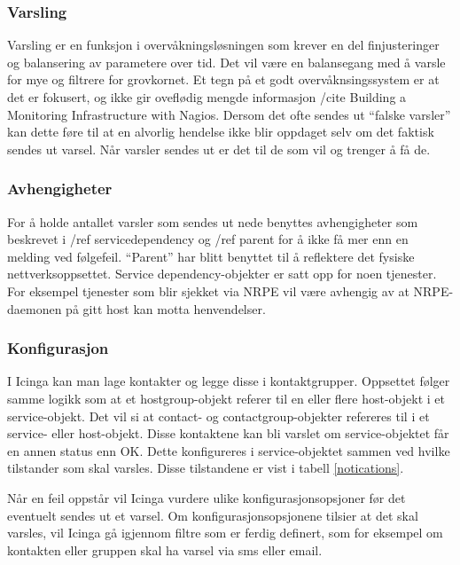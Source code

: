 \subsubsection{Varsling}
Varsling er en funksjon i overvåkningsløsningen som krever en del finjusteringer og balansering av parametere over tid. Det vil være en balansegang med å varsle for mye og filtrere for grovkornet. Et tegn på et godt overvåknsingssystem er at det er fokusert, og ikke gir oveflødig mengde informasjon /cite {Building a Monitoring Infrastructure with Nagios}. Dersom det ofte sendes ut “falske varsler” kan dette føre til at en alvorlig hendelse ikke blir oppdaget selv om det faktisk sendes ut varsel. Når varsler sendes ut er det til de som vil og trenger å få de.

\subsubsection{Avhengigheter}
For å holde antallet varsler som sendes ut nede benyttes avhengigheter som beskrevet i /ref {servicedependency} og /ref {parent} for å ikke få mer enn en melding ved følgefeil. “Parent” har blitt benyttet til å reflektere det fysiske nettverksoppsettet. Service dependency-objekter er satt opp for noen tjenester. For eksempel tjenester som blir sjekket via NRPE vil være avhengig av at NRPE-daemonen på gitt host kan motta henvendelser.

\subsubsection{Konfigurasjon}
I Icinga kan man lage kontakter og legge disse i kontaktgrupper. Oppsettet følger samme logikk som at et hostgroup-objekt referer til en eller flere host-objekt i et service-objekt.
Det vil si at contact- og contactgroup-objekter refereres til i et service- eller host-objekt. Disse kontaktene kan bli varslet om service-objektet får en annen status enn OK. Dette konfigureres i service-objektet sammen ved hvilke tilstander som skal varsles. Disse tilstandene er vist i tabell \ref{notications}.

Når en feil oppstår vil Icinga vurdere ulike konfigurasjonsopsjoner før det eventuelt sendes ut et varsel. Om konfigurasjonsopsjonene tilsier at det skal varsles, vil Icinga gå igjennom filtre som er ferdig definert, som for eksempel om kontakten eller gruppen skal ha varsel via sms eller email. 

